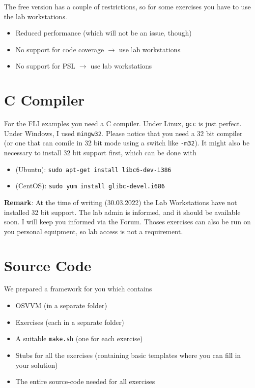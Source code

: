 \documentclass[12pt,epsf,makeidx,oneside]{book}
\begin{document}
  The free version has a couple of restrictions, so for some exercises you have to use the lab workstations.
  \begin{itemize}[noitemsep]
    \item Reduced performance (which will not be an issue, though)
    \item No support for code coverage $\rightarrow$ use lab workstations
    \item No support for PSL $\rightarrow$ use lab workstations
  \end {itemize}

\section{C Compiler}
  For the FLI examples you need a C compiler. Under Linux, {\tt gcc} is just perfect. Under Windows, I used {\tt mingw32}. Please notice that you need a 32 bit compiler (or one that can comile in 32 bit mode using a switch like {\tt -m32}).
  It might also be necessary to install 32 bit support first, which can be done with 
  \begin{itemize}
    \item (Ubuntu): {\tt sudo apt-get install libc6-dev-i386}
    \item (CentOS): {\tt sudo yum install glibc-devel.i686 }
  \end{itemize}

  {\bf Remark}: At the time of writing (30.03.2022) the Lab Workstations have not installed 32 bit support. The lab admin is informed, and it should be available soon. I will keep you informed via the Forum. Thoses exercises can also be 
  run on you personal equipment, so lab access is not a requirement.

\section{Source Code}
  We prepared a framework for you which contains
  \begin{itemize}[noitemsep]
    \item OSVVM (in a separate folder)
    \item Exercises (each in a separate folder)
    \item A suitable {\tt make.sh} (one for each exercise)
    \item Stubs for all the exercises (containing basic templates where you can fill in your solution)
    \item The entire source-code needed for all exercises
  \end {itemize}
\end{document}
